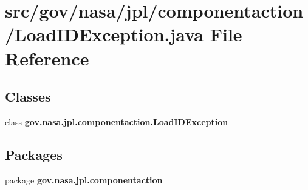 \section{src/gov/nasa/jpl/componentaction/\+Load\+I\+D\+Exception.java File Reference}
\label{_load_i_d_exception_8java}
\subsection*{Classes}
\begin{DoxyCompactItemize}
\item 
class {\bf gov.\+nasa.\+jpl.\+componentaction.\+Load\+I\+D\+Exception}
\end{DoxyCompactItemize}
\subsection*{Packages}
\begin{DoxyCompactItemize}
\item 
package {\bf gov.\+nasa.\+jpl.\+componentaction}
\end{DoxyCompactItemize}
